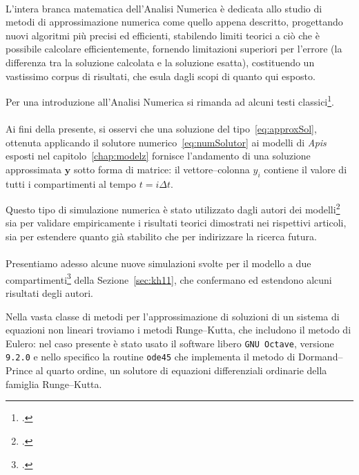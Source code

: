 \paragraph{}
L'intera branca matematica dell'Analisi Numerica è dedicata allo studio di metodi di approssimazione numerica come quello
appena descritto, progettando nuovi algoritmi più precisi ed efficienti, stabilendo limiti teorici a ciò che è possibile
calcolare efficientemente, fornendo limitazioni superiori per l'errore (la differenza tra la soluzione calcolata e la soluzione esatta), costituendo un vastissimo corpus di risultati, che esula dagli scopi di quanto qui esposto.

Per una introduzione all'Analisi Numerica si rimanda ad alcuni testi classici\footcite{ananum,ananumlin,demmel}.

\paragraph{}
Ai fini della presente, si osservi che una soluzione del tipo~\eqref{eq:approxSol}, ottenuta applicando il solutore
numerico~\eqref{eq:numSolutor} ai modelli di \emph{Apis} esposti nel capitolo~\ref{chap:modelz} fornisce l'andamento
di una soluzione approssimata $\mathbf{y}$ sotto forma di matrice: il vettore--colonna $y_i$ contiene il valore di
tutti i compartimenti al tempo $t = i \Delta t$.


Questo tipo di simulazione numerica è stato utilizzato dagli autori dei modelli\footcite{khoury2011,ratti2017}
sia per validare empiricamente i risultati teorici dimostrati nei rispettivi articoli, sia per estendere
quanto già stabilito che per indirizzare la ricerca futura.

\paragraph{}
Presentiamo adesso alcune nuove simulazioni svolte per il modello a due compartimenti\footcite{khoury2011}
della Sezione~\ref{sec:kh11}, che confermano ed estendono alcuni risultati degli autori.

Nella vasta classe di metodi per l'approssimazione di soluzioni di un sistema di equazioni
non lineari troviamo i metodi Runge--Kutta, che includono il metodo di Eulero:
nel caso presente è stato usato il software libero \texttt{GNU Octave}, versione \texttt{9.2.0} e nello specifico
la routine \texttt{ode45} che implementa il metodo di Dormand--Prince al quarto ordine, un solutore
di equazioni differenziali ordinarie della famiglia Runge--Kutta.

